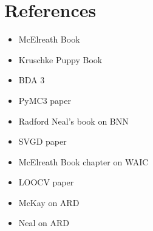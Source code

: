 \documentclass[10pt,a4paper]{article}
\begin{document}
	\section{References}
		\begin{itemize}
			\item McElreath Book
			\item Kruschke Puppy Book
			\item BDA 3
			\item PyMC3 paper
			\item Radford Neal's book on BNN
			\item SVGD paper
			\item McElreath Book chapter on WAIC
			\item LOOCV paper
			\item McKay on ARD
			\item Neal on ARD
		\end{itemize}
\end{document}
